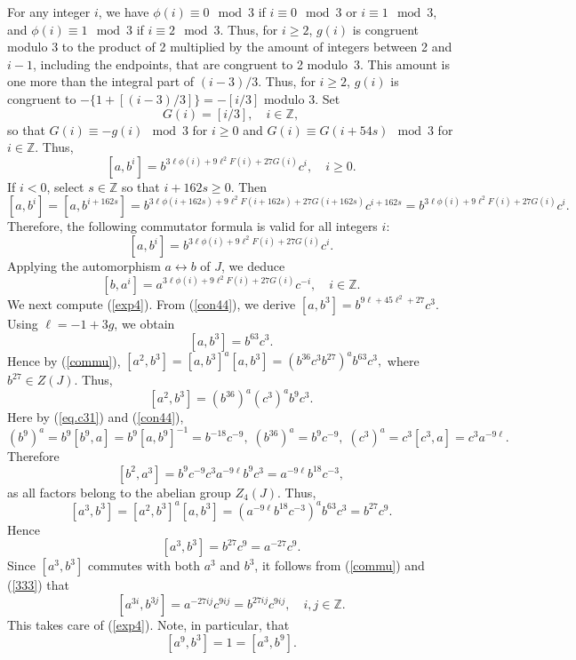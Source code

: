 \documentclass{amsart}
\theoremstyle{definition}
\theoremstyle{remark}
\newcommand \Z{{\mathbb Z}}
\begin{document}
{For any integer $i$, we have $\phi(i)\equiv 0\mod 3$ if $i\equiv 0\mod 3$ or $i\equiv 1\mod 3$, and $\phi(i)\equiv 1\mod 3$
if $i\equiv 2\mod 3$. Thus, for $i\geq 2$, $g(i)$ is congruent modulo 3 to the product of 2 multiplied by the amount of
integers between 2 and $i-1$, including the endpoints, that are congruent to 2 modulo~3. This amount is one more than 
the integral part of $(i-3)/3$.
Thus, for $i\geq 2$, $g(i)$ is congruent to $-\{1+[(i-3)/3]\}=-[i/3]$ modulo 3. Set
$$
G(i)=[i/3],\quad i\in\Z,
$$
so  that $G(i)\equiv -g(i)\mod 3$ for $i\geq 0$ and $G(i)\equiv G(i+54s)\mod 3$ for $i\in\Z$. Thus,
$$
[a,b^i]=b^{3\ell\phi(i)+ 9\ell^2 F(i)+27G(i)} c^i,\quad i\geq 0.
$$
If $i<0$, select $s\in\Z$ so that $i+162s\geq 0$. Then
$$
[a,b^i]=[a,b^{i+162s}]=b^{3\ell\phi(i+162s)+ 9\ell^2 F(i+162s)+27G(i+162s)} c^{i+162 s}=
b^{3\ell\phi(i)+ 9\ell^2 F(i)+27G(i)} c^i.
$$
Therefore, the following commutator formula is valid for all integers $i$:
\begin{equation}
\label{con44}
[a,b^i]=b^{3\ell\phi(i)+ 9\ell^2 F(i)+27G(i)} c^i.
\end{equation}
Applying the automorphism $a\leftrightarrow b$ of $J$, we deduce 
\begin{equation}
\label{con55}
[b,a^i]=a^{3\ell\phi(i)+ 9\ell^2 F(i)+27G(i)} c^{-i},\quad i\in\Z.
\end{equation}
We next compute (\ref{exp4}). From (\ref{con44}), we derive
$[a,b^3]=b^{9\ell+45\ell^2+27}c^{3}$.
Using $\ell=-1+3g$, we obtain
\begin{equation}
\label{conq}
[a,b^3]=b^{63}c^{3}.
\end{equation}
Hence by (\ref{commu}),
$
[a^2,b^3]=[a,b^3]^a[a,b^3]=(b^{36}c^{3}b^{27})^a b^{63}c^{3},
$
where $b^{27}\in Z(J)$. Thus,
$$
[a^2,b^3]=(b^{36})^a (c^3)^a b^9 c^3.
$$
Here by (\ref{eq.c31}) and (\ref{con44}),
$$
(b^{9})^a=b^{9}[b^{9},a]=b^{9}[a,b^{9}]^{-1}=b^{-18} c^{-9},\; (b^{36})^a=b^{9} c^{-9},\;
(c^3)^a=c^{3}[c^3,a]=c^3 a^{-9\ell}.
$$
Therefore
$$
[b^2,a^3]=b^{9} c^{-9} c^3 a^{-9\ell} b^{9}c^{3}=a^{-9\ell}b^{18}c^{-3},
$$
as all factors belong to the abelian group $Z_4(J)$.  Thus,
$$
[a^3,b^3]=[a^2,b^3]^a[a,b^3]=(a^{-9\ell}b^{18} c^{-3})^a b^{63}c^{3}=b^{27}c^9.
$$
Hence
\begin{equation}
\label{333}
[a^3,b^3]=b^{27}c^9=a^{-27}c^9.
\end{equation}
Since $[a^3,b^3]$ commutes with both $a^3$ and $b^3$, it follows from (\ref{commu}) and (\ref{333}) that
\begin{equation}
\label{666}
[a^{3i},b^{3j}]=a^{-27ij}c^{9ij}=b^{27ij}c^{9ij},\quad i,j\in\Z.
\end{equation}
This takes care of (\ref{exp4}). Note, in particular, that
\begin{equation}
\label{999}
[a^9,b^3]=1=[a^3,b^9].
\end{equation}

}
\end{document}
